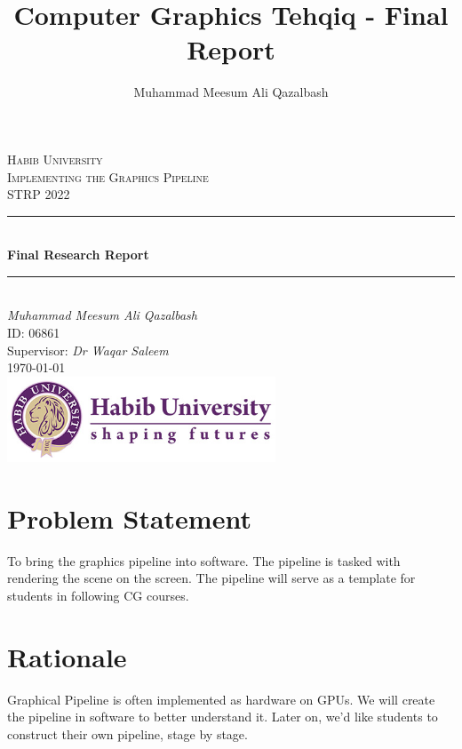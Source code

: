 \documentclass[a4paper]{article}
\title{Computer Graphics Tehqiq - Final Report}
\author{Muhammad Meesum Ali Qazalbash}
\theoremstyle{mytheoremstyle}
\theoremstyle{mytheoremstyle}
\theoremstyle{myproblemstyle}
\begin{document}
\begin{titlepage}

    \newcommand{\HRule}{\rule{\linewidth}{0.5mm}} 							%
    \center

    \textsc{\LARGE Habib University}\\[1cm]

    \textsc{\Large Implementing the Graphics Pipeline}\\[0.2cm]
    \textsc{\large STRP 2022}\\[1cm] 										%
    \HRule \\[0.8cm]
    { \huge \bfseries Final Research Report}\\[0.7cm]								%
    \HRule \\[2cm]
    \large
    \emph{Muhammad Meesum Ali Qazalbash}\\
    ID: 06861\\ Supervisor: \emph{Dr Waqar Saleem}\\[1.5cm]													%
    {\large \today}\\[5cm]
    \includegraphics[width=0.6\textwidth]{HU-LOGO--01.jpg}\\[1cm] 	%
    \vfill

\end{titlepage}
\newpage
\tableofcontents
\newpage
\section{Problem Statement}
To bring the graphics pipeline into software. The pipeline is tasked with rendering the scene on the screen. The pipeline will serve as a template for students in following CG courses.

\section{Rationale}
Graphical Pipeline is often implemented as hardware on GPUs. We will create the pipeline in software to better understand it. Later on, we'd like students to construct their own pipeline, stage by stage.
\end{document}
